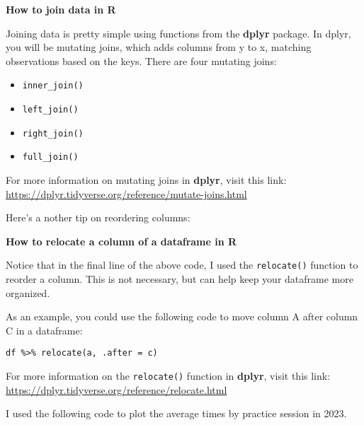 \documentclass[
]{book}
\providecommand{\tightlist}{%
  \setlength{\itemsep}{0pt}\setlength{\parskip}{0pt}}
\begin{document}
\begin{blackbox}

\begin{center}
\textbf{How to join data in R}

\end{center}

Joining data is pretty simple using functions from the \textbf{dplyr} package. In dplyr, you will be mutating joins, which adds columns from y to x, matching observations based on the keys. There are four mutating joins:

\begin{itemize}
\tightlist
\item
  \texttt{inner\_join()}
\item
  \texttt{left\_join()}
\item
  \texttt{right\_join()}
\item
  \texttt{full\_join()}
\end{itemize}

For more information on mutating joins in \textbf{dplyr}, visit this link: \url{https://dplyr.tidyverse.org/reference/mutate-joins.html}

\end{blackbox}

Here's a nother tip on reordering columns:

\begin{blackbox}

\begin{center}
\textbf{How to relocate a column of a dataframe in R}

\end{center}

Notice that in the final line of the above code, I used the \texttt{relocate()} function to reorder a column. This is not necessary, but can help keep your dataframe more organized.

As an example, you could use the following code to move column A after column C in a dataframe:

\texttt{df\ \%\textgreater{}\%\ relocate(a,\ .after\ =\ c)}

For more information on the \texttt{relocate()} function in \textbf{dplyr}, visit this link: \url{https://dplyr.tidyverse.org/reference/relocate.html}

\end{blackbox}

I used the following code to plot the average times by practice session in 2023.
\end{document}
